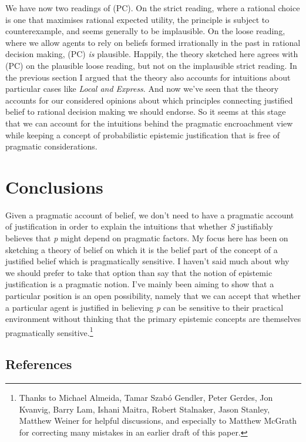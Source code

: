 \documentclass[
  10pt,
  letterpaper,
  DIV=11,
  numbers=noendperiod,
  twoside]{scrartcl}
\begin{document}
We have now two readings of (PC). On the strict reading, where a
rational choice is one that maximises rational expected utility, the
principle is subject to counterexample, and seems generally to be
implausible. On the loose reading, where we allow agents to rely on
beliefs formed irrationally in the past in rational decision making,
(PC) \emph{is} plausible. Happily, the theory sketched here agrees with
(PC) on the plausible loose reading, but not on the implausible strict
reading. In the previous section I argued that the theory also accounts
for intuitions about particular cases like \emph{Local and Express}. And
now we've seen that the theory accounts for our considered opinions
about which principles connecting justified belief to rational decision
making we should endorse. So it seems at this stage that we can account
for the intuitions behind the pragmatic encroachment view while keeping
a concept of probabilistic epistemic justification that is free of
pragmatic considerations.

\section{Conclusions}\label{conclusions}

Given a pragmatic account of belief, we don't need to have a pragmatic
account of justification in order to explain the intuitions that whether
\emph{S} justifiably believes that \emph{p} might depend on pragmatic
factors. My focus here has been on sketching a theory of belief on which
it is the belief part of the concept of a justified belief which is
pragmatically sensitive. I haven't said much about why we should prefer
to take that option than say that the notion of epistemic justification
is a pragmatic notion. I've mainly been aiming to show that a particular
position is an open possibility, namely that we can accept that whether
a particular agent is justified in believing \emph{p} can be sensitive
to their practical environment without thinking that the primary
epistemic concepts are themselves pragmatically sensitive.\footnote{Thanks
  to Michael Almeida, Tamar Szabó Gendler, Peter Gerdes, Jon Kvanvig,
  Barry Lam, Ishani Maitra, Robert Stalnaker, Jason Stanley, Matthew
  Weiner for helpful discussions, and especially to Matthew McGrath for
  correcting many mistakes in an earlier draft of this paper.}

\subsection*{References}\label{references}
\end{document}
